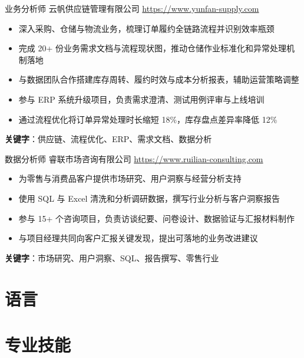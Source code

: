 \documentclass[a4paper, serif, 10pt]{moderncv}
\begin{document}
        {业务分析师}
        {云帆供应链管理有限公司}
        {\url{https://www.yunfan-supply.com}}
        {}
        {\begin{itemize}
\item 深入采购、仓储与物流业务，梳理订单履约全链路流程并识别效率瓶颈
\item 完成 20+ 份业务需求文档与流程现状图，推动仓储作业标准化和异常处理机制落地
\item 与数据团队合作搭建库存周转、履约时效与成本分析报表，辅助运营策略调整
\item 参与 ERP 系统升级项目，负责需求澄清、测试用例评审与上线培训
\item 通过流程优化将订单异常处理时长缩短 18\%，库存盘点差异率降低 12\%
\end{itemize}
\textbf{关键字}：供应链、流程优化、ERP、需求文档、数据分析}

        {数据分析师}
        {睿联市场咨询有限公司}
        {\url{https://www.ruilian-consulting.com}}
        {}
        {\begin{itemize}
\item 为零售与消费品客户提供市场研究、用户洞察与经营分析支持
\item 使用 SQL 与 Excel 清洗和分析调研数据，撰写行业分析与客户洞察报告
\item 参与 15+ 个咨询项目，负责访谈纪要、问卷设计、数据验证与汇报材料制作
\item 与项目经理共同向客户汇报关键发现，提出可落地的业务改进建议
\end{itemize}
\textbf{关键字}：市场研究、用户洞察、SQL、报告撰写、零售行业}
\section{语言}

\section{专业技能}

\end{document}
